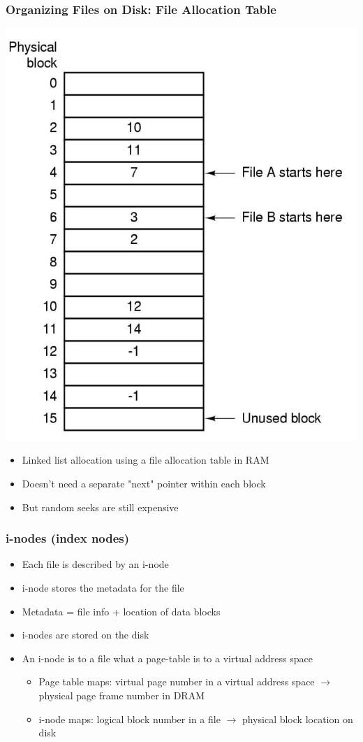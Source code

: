 \documentclass[12pt]{article}
\begin{document}
\subsubsection{Organizing Files on Disk: File Allocation Table}
\includegraphics[width=\textwidth]{FileAllocationTable.png}
\begin{itemize}
    \item Linked list allocation using a file allocation table in RAM 
    \item Doesn’t need a separate "next" pointer within each block 
    \item But random seeks are still expensive
\end{itemize}
\subsubsection{i-nodes (index nodes)}
\begin{itemize}
    \item Each file is described by an i-node 
    \item i-node stores the metadata for the file 
    \item Metadata = file info + location of data blocks 
    \item i-nodes are stored on the disk 
    \item An i-node is to a file what a page-table is to a virtual address space \begin{itemize}
        \item Page table maps: virtual page number in a virtual address space $\to$ physical page frame number in DRAM 
        \item i-node maps: logical block number in a file $\to$ physical block location on disk
    \end{itemize}
\end{itemize}
\end{document}
